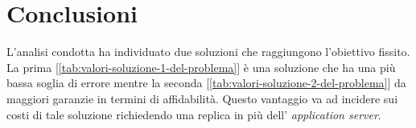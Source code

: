 \documentclass[../main.tex]{subfiles}
\begin{document}
    \chapter{Conclusioni}\label{ch:conclusioni}
    L'analisi condotta ha individuato due soluzioni che raggiungono l'obiettivo fissito.
    La prima [\ref{tab:valori-soluzione-1-del-problema}] è una soluzione che ha una più bassa soglia di errore mentre la
    seconda [\ref{tab:valori-soluzione-2-del-problema}] da maggiori garanzie in termini di affidabilità.
    Questo vantaggio va ad incidere sui costi di tale soluzione richiedendo una replica in più dell'
    \textit{application server}.
\end{document}
